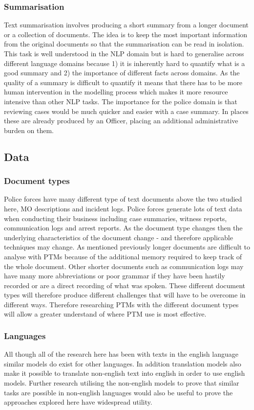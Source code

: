 \subsubsection{Summarisation} Text summarisation involves producing a short summary from a longer document or a collection of documents. The idea is to keep the most important information from the original documents so that the summarisation can be read in isolation. This task is well understood in the NLP domain but is hard to generalise across different language domains because 1) it is inherently hard to quantify what is a good summary and 2) the importance of different facts across domains. As the quality of a summary is difficult to quantify it means that there has to be more human intervention in the modelling process which makes it more resource intensive than other NLP tasks. The importance for the police domain is that reviewing cases would be much quicker and easier with a case summary. In places these are already produced by an Officer, placing an additional administrative burden on them.


\subsection{Data}

\subsubsection{Document types} Police forces have many different type of text documents above the two studied here, MO descriptions and incident logs. Police forces generate lots of text data when conducting their business including case summaries, witness reports, communication logs and arrest reports. As the document type changes then the underlying characteristics of the document change - and therefore applicable techniques may change. As mentioned previously longer documents are difficult to analyse with PTMs because of the additional memory required to keep track of the whole document. Other shorter documents such as communication logs may have many more abbreviations or poor grammar if they have been hastily recorded or are a direct recording of what was spoken. These different document types will therefore produce different challenges that will have to be overcome in different ways. Therefore researching PTMs with the different document types will allow a greater understand of where PTM use is most effective.


\subsubsection{Languages} All though all of the research here has been with texts in the english language similar models do exist for other languages. In addition translation models also make it possible to translate non-english text into english in order to use english models. Further research utilising the non-english models to prove that similar tasks are possible in non-english languages would also be useful to prove the approaches explored here have widespread utility. 


